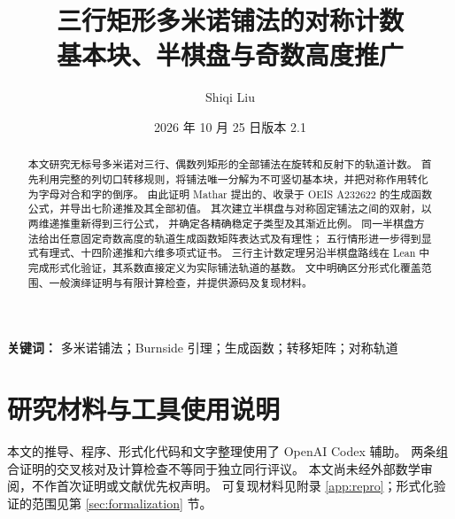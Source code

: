 \documentclass[UTF8,a4paper,11pt,fontset=fandol]{ctexart}
\title{\bfseries 三行矩形多米诺铺法的对称计数\\[4pt]
\large 基本块、半棋盘与奇数高度推广}
\author{Shiqi Liu}
\date{2026 年 10 月 25 日\quad 版本 2.1}
\theoremstyle{definition}
\theoremstyle{remark}
\numberwithin{equation}{section}
\begin{document}
\maketitle
\begin{abstract}
本文研究无标号多米诺对三行、偶数列矩形的全部铺法在旋转和反射下的轨道计数。
首先利用完整的列切口转移规则，将铺法唯一分解为不可竖切基本块，并把对称作用转化为字母对合和字的倒序。
由此证明 Mathar 提出的、收录于 OEIS A232622 的生成函数公式，并导出七阶递推及其全部初值。
其次建立半棋盘与对称固定铺法之间的双射，以两维递推重新得到三行公式，
并确定各精确稳定子类型及其渐近比例。
同一半棋盘方法给出任意固定奇数高度的轨道生成函数矩阵表达式及有理性；
五行情形进一步得到显式有理式、十四阶递推和六维多项式证书。
三行主计数定理另沿半棋盘路线在 Lean 中完成形式化验证，其系数直接定义为实际铺法轨道的基数。
文中明确区分形式化覆盖范围、一般演绎证明与有限计算检查，并提供源码及复现材料。
\end{abstract}
\noindent\textbf{关键词：} 多米诺铺法；Burnside 引理；生成函数；转移矩阵；对称轨道









\section*{研究材料与工具使用说明}
本文的推导、程序、形式化代码和文字整理使用了 OpenAI Codex 辅助。
两条组合证明的交叉核对及计算检查不等同于独立同行评议。
本文尚未经外部数学审阅，不作首次证明或文献优先权声明。
可复现材料见附录 \ref{app:repro}；形式化验证的范围见第 \ref{sec:formalization} 节。
\appendix


\clearpage

\end{document}
